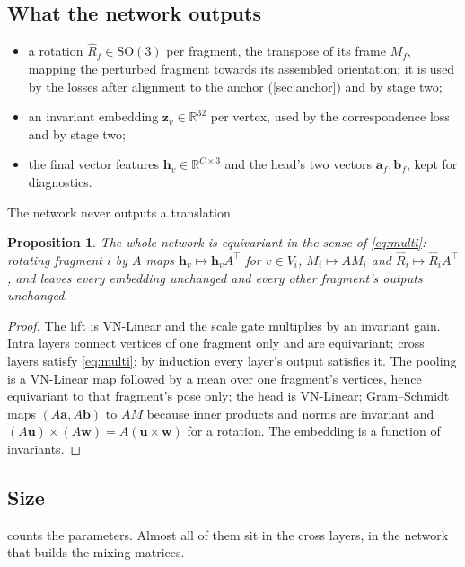 \documentclass[11pt,a4paper]{article}
\newtheorem{proposition}{Proposition}
\theoremstyle{remark}
\newcommand{\R}{\mathbb{R}}
\newcommand{\SO}{\mathrm{SO}(3)}
\newcommand{\z}{\mathbf{z}}
\newcommand{\T}{^{\top}}
\begin{document}
\subsection{What the network outputs}
\begin{itemize}
  \item a rotation $\hat R_f\in\SO$ per fragment, the transpose of its frame $M_f$, mapping the perturbed fragment towards its assembled orientation; it is used by the losses after alignment to the anchor (\cref{sec:anchor}) and by stage two;
  \item an invariant embedding $\z_v\in\R^{32}$ per vertex, used by the correspondence loss and by stage two;
  \item the final vector features $\mathbf h_v\in\R^{C\times3}$ and the head's two vectors $\mathbf a_f,\mathbf b_f$, kept for diagnostics.
\end{itemize}
The network never outputs a translation.

\begin{proposition}
The whole network is equivariant in the sense of \cref{eq:multi}: rotating fragment $i$ by $A$ maps $\mathbf h_v\mapsto\mathbf h_vA\T$ for $v\in V_i$, $M_i\mapsto AM_i$ and $\hat R_i\mapsto\hat R_iA\T$, and leaves every embedding unchanged and every other fragment's outputs unchanged.
\end{proposition}
\begin{proof}
The lift is VN-Linear and the scale gate multiplies by an invariant gain. Intra layers connect vertices of one fragment only and are equivariant; cross layers satisfy \cref{eq:multi}; by induction every layer's output satisfies it. The pooling is a VN-Linear map followed by a mean over one fragment's vertices, hence equivariant to that fragment's pose only; the head is VN-Linear; Gram--Schmidt maps $(A\mathbf a,A\mathbf b)$ to $AM$ because inner products and norms are invariant and $(A\mathbf u)\times(A\mathbf w)=A(\mathbf u\times\mathbf w)$ for a rotation. The embedding is a function of invariants.
\end{proof}

\subsection{Size}
 counts the parameters. Almost all of them sit in the cross layers, in the network that builds the mixing matrices.
\end{document}
